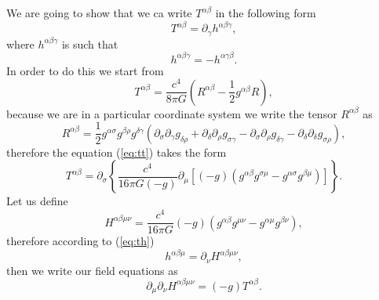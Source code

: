 We are going to show that we ca write $T^{\alpha\beta}$ in the following
form
\begin{equation}
T^{\alpha\beta}=\partial_{\gamma}h^{\alpha\beta\gamma},\label{eq:th}
\end{equation}
where $h^{\alpha\beta\gamma}$ is such that
\[
h^{\alpha\beta\gamma}=-h^{\alpha\gamma\beta}.
\]
In order to do this we start from
\begin{equation}
T^{\alpha\beta}=\frac{c^{4}}{8\pi G}\left(R^{\alpha\beta}-\frac{1}{2}g^{\alpha\beta}R\right),\label{eq:tt}
\end{equation}
because we are in a particular coordinate system we write the tensor
$R^{\alpha\beta}$ as
\[
R^{\alpha\beta}=\frac{1}{2}g^{\alpha\sigma}g^{\beta\rho}g^{\delta\gamma}\left(\partial_{\sigma}\partial_{\gamma}g_{\delta\rho}+\partial_{\delta}\partial_{\rho}g_{\sigma\gamma}-\partial_{\sigma}\partial_{\rho}g_{\delta\gamma}-\partial_{\delta}\partial_{\delta}g_{\sigma\rho}\right),
\]
therefore the equation (\ref{eq:tt}) takes the form
\[
T^{\alpha\beta}=\partial_{\sigma}\left\{ \frac{c^{4}}{16\pi G\left(-g\right)}\partial_{\mu}\left[\left(-g\right)\left(g^{\alpha\beta}g^{\sigma\mu}-g^{\alpha\sigma}g^{\beta\mu}\right)\right]\right\} .
\]
Let us define
\begin{equation}
H^{\alpha\beta\mu\nu}=\frac{c^{4}}{16\pi G}\left(-g\right)\left(g^{\alpha\beta}g^{\mu\nu}-g^{\alpha\mu}g^{\beta\nu}\right),\label{eq:H}
\end{equation}
therefore according to (\ref{eq:th})
\[
h^{\alpha\beta\mu}=\partial_{\nu}H^{\alpha\beta\mu\nu},
\]
then we write our field equations as
\[
\partial_{\mu}\partial_{\nu}H^{\alpha\beta\mu\nu}=\left(-g\right)T^{\alpha\beta}.
\]


